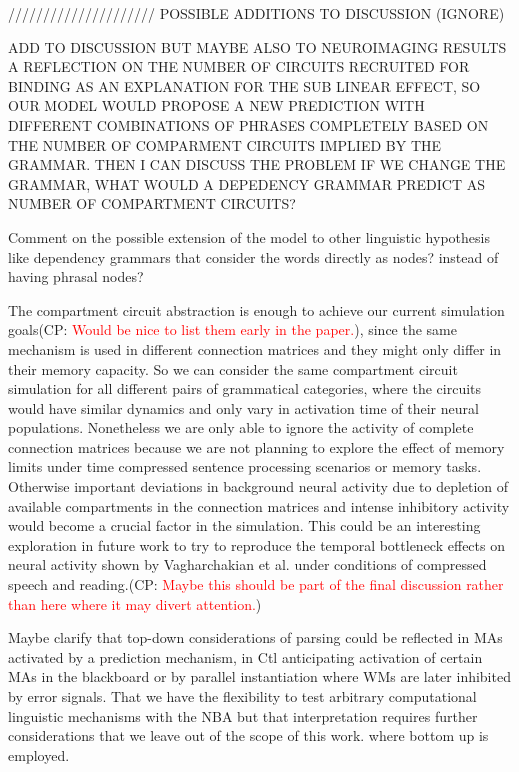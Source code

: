 \documentclass[10pt]{article}
\newcommand{\noteCP}[1]{(CP: \textcolor{red}{#1})}
\begin{document}
///////////////////// POSSIBLE ADDITIONS TO DISCUSSION (IGNORE)

ADD TO DISCUSSION BUT MAYBE ALSO TO NEUROIMAGING RESULTS A REFLECTION ON THE NUMBER OF CIRCUITS RECRUITED FOR BINDING AS AN EXPLANATION FOR THE SUB LINEAR EFFECT, SO OUR MODEL WOULD PROPOSE A NEW PREDICTION WITH DIFFERENT COMBINATIONS OF PHRASES COMPLETELY BASED ON THE NUMBER OF COMPARMENT CIRCUITS IMPLIED BY THE GRAMMAR. THEN I CAN DISCUSS THE PROBLEM IF WE CHANGE THE GRAMMAR, WHAT WOULD A DEPEDENCY GRAMMAR PREDICT AS NUMBER OF COMPARTMENT CIRCUITS?


Comment on the possible extension of the model to other linguistic hypothesis like dependency grammars that consider the words directly as nodes? instead of having phrasal nodes?


The compartment circuit abstraction is enough to achieve our current simulation goals\noteCP{Would be nice to list them early in the paper.}, since the same mechanism is used in different connection matrices and they might only differ in their memory capacity.
So we can consider the same compartment circuit simulation for all different pairs of grammatical categories, where the circuits would have similar dynamics and only vary in activation time of their neural populations.
Nonetheless we are only able to ignore the activity of complete connection matrices because we are not planning to explore the effect of memory limits under time compressed sentence processing scenarios or memory tasks.
Otherwise important deviations in background neural activity due to depletion of available compartments in the connection matrices and intense inhibitory activity would become a crucial factor in the simulation.
This could be an interesting exploration in future work to try to reproduce the temporal bottleneck effects on neural activity shown by Vagharchakian et al. under conditions of compressed speech and reading\cite{Vagharchakian_2012}.\noteCP{Maybe this should be part of the final discussion rather than here where it may divert attention.}


Maybe clarify that top-down considerations of parsing could be reflected in MAs activated by a prediction mechanism, in Ctl anticipating activation of certain MAs in the blackboard or by parallel instantiation where WMs are later inhibited by error signals.
That we have the flexibility to test arbitrary computational linguistic mechanisms with the NBA but that interpretation requires further considerations that we leave out of the scope of this work.
where bottom up is employed.
\end{document}
